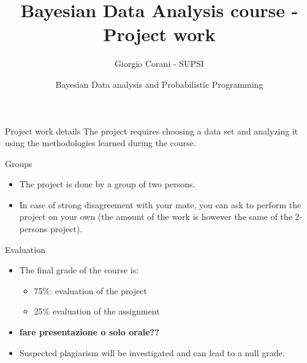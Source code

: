 \documentclass[
  13pt,
  ignorenonframetext,
]{beamer}
\title{Bayesian Data Analysis course - Project work}
\author{Giorgio Corani - SUPSI}
\date{Bayesian Data analysis and Probabilistic Programming}
\providecommand{\tightlist}{%
  \setlength{\itemsep}{0pt}\setlength{\parskip}{0pt}}
\begin{document}
\frame{\titlepage}

\begin{frame}
\begin{block}{Project work details}
\protect\hypertarget{project-work-details}{}
The project requires choosing a data set and analyzing it using the
methodologies learned during the course.
\end{block}
\end{frame}

\begin{frame}{Groups}
\protect\hypertarget{groups}{}
\begin{itemize}
\tightlist
\item
  The project is done by a group of two persons.
\item
  In case of strong disagreement with your mate, you can ask to perform
  the project on your own (the amount of the work is however the same of
  the 2-persons project).
\end{itemize}
\end{frame}

\begin{frame}{Evaluation}
\protect\hypertarget{evaluation}{}
\begin{itemize}
\item
  The final grade of the course is:

  \begin{itemize}
  \tightlist
  \item
    75\%: evaluation of the project
  \item
    25\% evaluation of the assignment
  \end{itemize}
\item
  \textbf{fare presentazione o solo orale?? }
\item
  Suspected plagiarism will be investigated and can lead to a null
  grade.
\end{itemize}
\end{frame}
\end{document}
